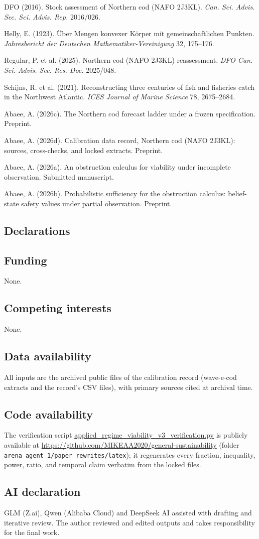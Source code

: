 \documentclass[10pt,twocolumn]{article}
\theoremstyle{plain}
\theoremstyle{remark}
\begin{document}
{\footnotesize
DFO (2016). Stock assessment of Northern cod (NAFO 2J3KL). \emph{Can.
Sci. Advis. Sec. Sci. Advis. Rep.} 2016/026.

Helly, E. (1923). \"Uber Mengen konvexer K\"orper mit gemeinschaftlichen
Punkten. \emph{Jahresbericht der Deutschen Mathematiker-Vereinigung}
32, 175--176.

Regular, P. et al. (2025). Northern cod (NAFO 2J3KL) reassessment.
\emph{DFO Can. Sci. Advis. Sec. Res. Doc.} 2025/048.

Schijns, R. et al. (2021). Reconstructing three centuries of fish and
fisheries catch in the Northwest Atlantic. \emph{ICES Journal of Marine
Science} 78, 2675--2684.

Abaee, A. (2026c). The Northern cod forecast ladder under a frozen
specification. Preprint.

Abaee, A. (2026d). Calibration data record, Northern cod (NAFO 2J3KL):
sources, cross-checks, and locked extracts. Preprint.

Abaee, A. (2026a). An obstruction calculus for viability under
incomplete observation. Submitted manuscript.

Abaee, A. (2026b). Probabilistic sufficiency for the obstruction
calculus: belief-state safety values under partial observation.
Preprint.
}

\subsection*{Declarations}

\subsection*{Funding}
None.

\subsection*{Competing interests}
None.

\subsection*{Data availability}
All inputs are the archived public files of the calibration record
(wave-e-cod extracts and the record's CSV files), with primary sources
cited at archival time.

\subsection*{Code availability}
The verification script
\url{applied_regime_viability_v3_verification.py}
is publicly available at
\url{https://github.com/MIKEAA2020/general-sustainability} (folder
\texttt{arena agent 1/paper rewrites/latex}); it regenerates every
fraction, inequality, power, ratio, and temporal claim verbatim from
the locked files.

\subsection*{AI declaration}
GLM (Z.ai), Qwen (Alibaba Cloud) and DeepSeek AI assisted with drafting
and iterative review. The author reviewed and edited outputs and takes
responsibility for the final work.
\end{document}
